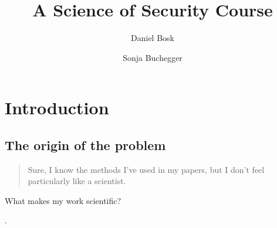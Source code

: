 \title{%
  A Science of Security Course
}
\author{Daniel Bosk \and Sonja Buchegger}


\mode*

\begin{abstract}
  
\end{abstract}


\section{Introduction}

\subsection{The origin of the problem}

\begin{frame}
  \blockcquote{Anonymous}{%
    Sure, I know the methods I've used in my papers, but I don't feel 
    particularly like a scientist.%
  }
\end{frame}

\begin{frame}
  \begin{center}
    What makes my work scientific?
  \end{center}
\end{frame}

\begin{frame}
\end{frame}

\begin{frame}
      .
\end{frame}

